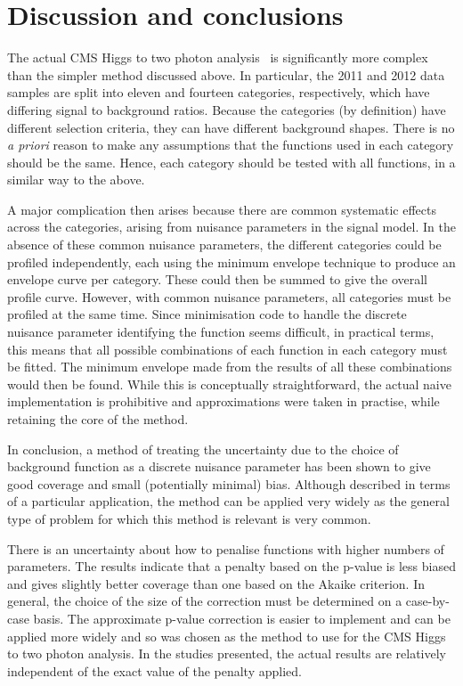 \section{Discussion and conclusions} %
\label{sec:conclusions}
The actual CMS
Higgs to two photon analysis~\cite{ref:introduction:legacy}
is significantly more
complex than the simpler method discussed above. In particular, the 2011 
and 2012 data
samples are split into eleven and fourteen categories, respectively, which have
differing signal to background ratios.
Because the categories (by definition) have different selection criteria,
they can have different background shapes.
There is no {\it a priori} reason to make any assumptions that the functions
used in each category should be the same. Hence, each category should be
tested with all functions, in a similar way to the above.

A major complication then arises because there are common systematic effects
across the categories, arising from nuisance parameters in the signal
model.
In the absence of these common nuisance parameters,
the different categories could be profiled independently, each using the
minimum envelope technique to produce an envelope curve per category.
These could then
be summed to give the overall profile curve. However, with common
nuisance parameters, all categories must be profiled at the same time.
Since minimisation code to handle the 
discrete nuisance parameter identifying the
function seems difficult, in practical terms, this means that all possible
combinations of each function in each category must be fitted.
The minimum envelope made from the results of all these combinations would
then be found. While this is conceptually straightforward, the actual
naive implementation is prohibitive and approximations were taken in practise,
while retaining the core of the method.

In conclusion,
a method of treating the uncertainty due to the choice of background function
as a discrete nuisance parameter has been shown to give good coverage and
small (potentially minimal) bias.
Although described in terms of a particular application, the method can be
applied very widely as the general type of problem for which this method
is relevant is very common.

There is an uncertainty about how to penalise functions with higher numbers
of parameters. The results indicate that a penalty based on the p-value
is less biased and gives slightly better coverage than one based on the
Akaike criterion. In general, the choice of the size of the correction must be determined
on a case-by-case basis. The approximate p-value correction is easier to implement and
can be applied more widely and so was chosen as the method to use for the CMS Higgs to 
two photon analysis.
In the studies presented, the actual results are relatively independent of the exact value of the penalty 
applied.


